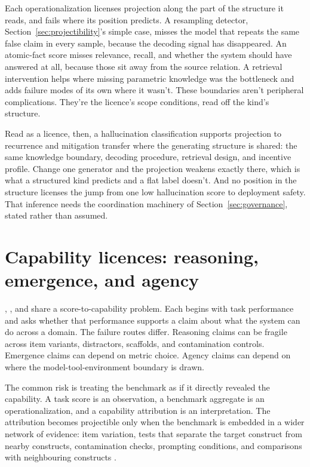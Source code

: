 \documentclass[12pt]{article}
\begin{document}
Each operationalization licenses projection along the part of the structure it
reads, and fails where its position predicts. A resampling detector,
Section~\ref{sec:projectibility}'s simple case, misses the model that repeats
the same false claim in every sample, because the decoding signal has
disappeared. An atomic-fact score misses relevance, recall, and
whether the system should have answered at all, because those sit away from
the source relation. A retrieval intervention helps where missing parametric
knowledge was the bottleneck and adds failure modes of its own where it wasn't.
These boundaries aren't peripheral complications. They're the licence's scope
conditions, read off the kind's structure.

Read as a licence, then, a hallucination classification supports projection to
recurrence and mitigation transfer where the generating structure is shared:
the same knowledge boundary, decoding procedure, retrieval design, and
incentive profile. Change one generator and the projection weakens exactly
there, which is what a structured kind predicts and a flat label doesn't. And
no position in the structure licenses the jump from one low hallucination score
to deployment safety. That inference needs the coordination machinery of
Section~\ref{sec:governance}, stated rather than assumed.

\section{Capability licences: reasoning, emergence, and agency}\label{sec:capability}

, , and  share a score-to-capability
problem. Each begins with task performance and asks whether that performance
supports a claim about what the system can do across a domain. The failure
routes differ. Reasoning claims can be fragile across item variants, distractors,
scaffolds, and contamination controls. Emergence claims can depend on metric
choice. Agency claims can depend on where the model-tool-environment boundary is
drawn.

The common risk is treating the benchmark as if it directly revealed the
capability. A task score is an observation, a benchmark aggregate is an
operationalization, and a capability attribution is an interpretation. The
attribution becomes projectible only when the benchmark is embedded in a wider
network of evidence: item variation, tests that separate the target construct
from nearby constructs, contamination checks, prompting conditions, and
comparisons with neighbouring constructs \citep{freiesleben2026establishing}.
\end{document}
